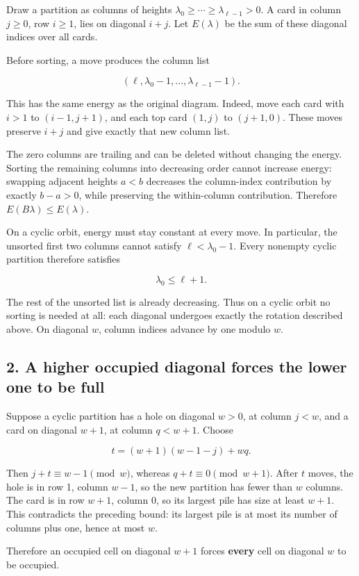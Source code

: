 \documentclass[11pt,a4paper]{article}
\begin{document}
Draw a partition as columns of heights $\lambda_0\ge\cdots\ge\lambda_{\ell-1}>0$. A card in column $j\ge0$, row $i\ge1$, lies on diagonal $i+j$. Let $E(\lambda)$ be the sum of these diagonal indices over all cards.

Before sorting, a move produces the column list

\[
(\ell,\lambda_0-1,\ldots,\lambda_{\ell-1}-1).
\]

This has the same energy as the original diagram. Indeed, move each card with $i>1$ to $(i-1,j+1)$, and each top card $(1,j)$ to $(j+1,0)$. These moves preserve $i+j$ and give exactly that new column list.

The zero columns are trailing and can be deleted without changing the energy. Sorting the remaining columns into decreasing order cannot increase energy: swapping adjacent heights $a<b$ decreases the column-index contribution by exactly $b-a>0$, while preserving the within-column contribution. Therefore $E(B\lambda)\le E(\lambda)$.

On a cyclic orbit, energy must stay constant at every move. In particular, the unsorted first two columns cannot satisfy $\ell<\lambda_0-1$. Every nonempty cyclic partition therefore satisfies

\[
\lambda_0\le\ell+1.
\]

The rest of the unsorted list is already decreasing. Thus on a cyclic orbit no sorting is needed at all: each diagonal undergoes exactly the rotation described above. On diagonal $w$, column indices advance by one modulo $w$.

\subsection{2. A higher occupied diagonal forces the lower one to be full}

Suppose a cyclic partition has a hole on diagonal $w>0$, at column $j<w$, and a card on diagonal $w+1$, at column $q<w+1$. Choose

\[
t=(w+1)(w-1-j)+wq.
\]

Then $j+t\equiv w-1\pmod w$, whereas $q+t\equiv0\pmod{w+1}$. After $t$ moves, the hole is in row 1, column $w-1$, so the new partition has fewer than $w$ columns. The card is in row $w+1$, column 0, so its largest pile has size at least $w+1$. This contradicts the preceding bound: its largest pile is at most its number of columns plus one, hence at most $w$.

Therefore an occupied cell on diagonal $w+1$ forces \textbf{every} cell on diagonal $w$ to be occupied.
\end{document}
